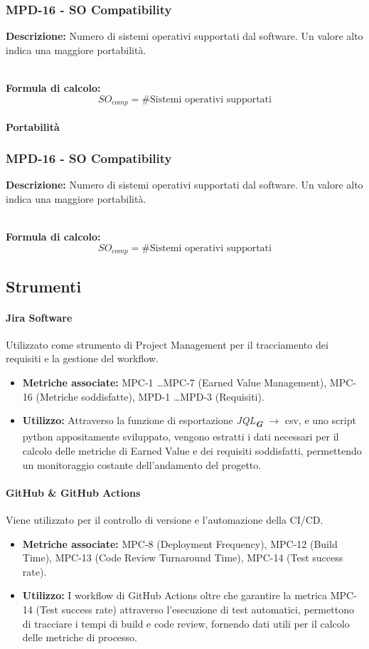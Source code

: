 \documentclass[a4paper,12pt]{article}
\newcommand{\glossario}[1]{\textit{#1}\textsubscript{\textbf{\textit{\textcolor{lightblack}{G}}}}}
\newcommand{\metricdef}[3]{
    \subsubsection*{#1 - #2}
    \textbf{Descrizione:} #3
}
\newcommand{\metricformula}[1]{
    \\[0.5em]
    \textbf{Formula di calcolo:}
    \begin{equation*}
        #1
    \end{equation*}
}
\begin{document}
\metricdef{MPD-16}{SO Compatibility}{Numero di sistemi operativi supportati dal software. Un valore alto indica una maggiore portabilità.}
\metricformula{SO_{comp} = \#\text{Sistemi operativi supportati}}
\paragraph{Portabilità}

\metricdef{MPD-16}{SO Compatibility}{Numero di sistemi operativi supportati dal software. Un valore alto indica una maggiore portabilità.}
\metricformula{SO_{comp} = \#\text{Sistemi operativi supportati}}

\subsection{Strumenti}
\paragraph{Jira Software}
Utilizzato come strumento di Project Management per il tracciamento dei requisiti e la gestione del workflow.
\begin{itemize}
    \item \textbf{Metriche associate:} MPC-1 \dots MPC-7 (Earned Value Management), MPC-16 (Metriche soddisfatte), MPD-1 \dots MPD-3 (Requisiti).
    \item \textbf{Utilizzo:} Attraverso la funzione di esportazione \glossario{JQL} $\rightarrow$ csv, e uno script python appositamente sviluppato, vengono estratti i dati necessari per il calcolo delle metriche di Earned Value e dei requisiti soddisfatti, permettendo un monitoraggio costante dell'andamento del progetto.
\end{itemize}

\paragraph{GitHub \& GitHub Actions}
Viene utilizzato per il controllo di versione e l'automazione della CI/CD.
\begin{itemize}
    \item \textbf{Metriche associate:} MPC-8 (Deployment Frequency), MPC-12 (Build Time), MPC-13 (Code Review Turnaround Time), MPC-14 (Test success rate).
    \item \textbf{Utilizzo:} I workflow di GitHub Actions oltre che garantire la metrica MPC-14 (Test success rate) attraverso l'esecuzione di test automatici, permettono di tracciare i tempi di build e code review, fornendo dati utili per il calcolo delle metriche di processo.
\end{itemize}
\end{document}
